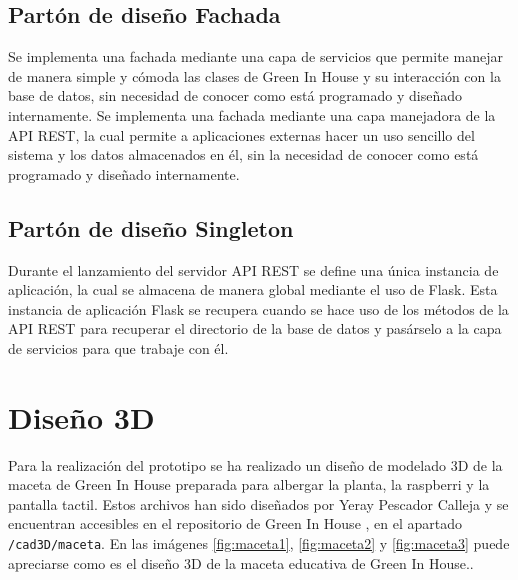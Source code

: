     \subsection{Partón de diseño Fachada}
        Se implementa una fachada mediante una capa de servicios que permite manejar de manera simple y cómoda las clases de Green In House y su interacción con la base de datos, sin necesidad de conocer como está programado y diseñado internamente.
        Se implementa una fachada mediante una capa manejadora de la API REST, la cual permite a aplicaciones externas hacer un uso sencillo del sistema y los datos almacenados en él, sin la necesidad de conocer como está programado y diseñado internamente.
    \subsection{Partón de diseño Singleton}
        Durante el lanzamiento del servidor API REST se define una única instancia de aplicación, la cual se almacena de manera global mediante el uso de Flask. Esta instancia de aplicación Flask se recupera cuando se hace uso de los métodos de la API REST para recuperar el directorio de la base de datos y pasárselo a la capa de servicios para que trabaje con él.

\section{Diseño 3D}

Para la realización del prototipo se ha realizado un diseño de modelado 3D de la maceta de Green In House preparada para albergar la planta, la raspberri y la pantalla tactil. Estos archivos han sido diseñados por Yeray Pescador Calleja y se encuentran accesibles en el repositorio de Green In House \cite{GreenInHouse:repo:Maceta}, en el apartado \texttt{/cad3D/maceta}. En las imágenes \ref{fig:maceta1}, \ref{fig:maceta2} y \ref{fig:maceta3} puede apreciarse como es el diseño 3D de la maceta educativa de Green In House..



